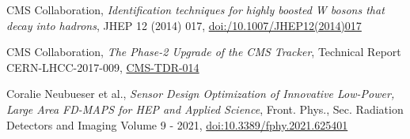 {\begin{thebibliography}{9}
\bibitem{[4]}
CMS Collaboration, {\em Identification techniques for highly boosted W bosons that decay into hadrons}, JHEP 12 (2014) 017, \href{https://link.springer.com/article/10.1007/JHEP12(2014)017}{doi:/10.1007/JHEP12(2014)017}

\bibitem{[5]}
CMS Collaboration, {\em The Phase-2 Upgrade of the CMS Tracker}, Technical Report CERN-LHCC-2017-009, \href{https://cds.cern.ch/record/2272264?ln=en}{CMS-TDR-014}

\bibitem{[6]}
Coralie Neubueser et al., {\em Sensor Design Optimization of Innovative Low-Power, Large Area FD-MAPS for HEP and Applied Science}, Front. Phys., Sec. Radiation Detectors and Imaging
Volume 9 - 2021, \href{https://doi.org/10.3389/fphy.2021.625401}{doi:10.3389/fphy.2021.625401}
\end{thebibliography}
}
